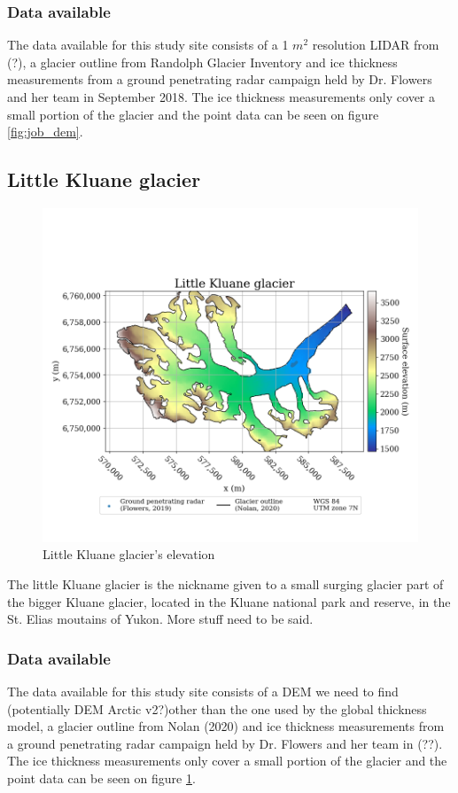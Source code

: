 \documentclass[a4, 12pt]{article}
\begin{document}
\subsubsection{Data available} %
The data available for this study site consists of a 1 $m^2$ resolution LIDAR from (?), a glacier outline from Randolph Glacier Inventory and ice thickness measurements from a ground penetrating radar campaign held by Dr. Flowers and her team in September 2018. The ice thickness measurements only cover a small portion of the glacier and the point data can be seen on figure \ref{fig:job_dem}.\\
\FloatBarrier
\subsection{Little Kluane glacier}
\begin{figure}[h!]
\centering
\includegraphics[scale=0.5]{../job_kluane_maps/Little Kluane glacier_elevation.png}
\caption{Little Kluane glacier's elevation}
\label{fig:lk_dem}
\end{figure}
The little Kluane glacier is the nickname given to a small surging glacier part of the bigger Kluane glacier, located in the Kluane national park and reserve, in the St. Elias moutains of Yukon. More stuff need to be said.
\subsubsection{Data available}
The data available for this study site consists of a DEM we need to find (potentially DEM Arctic v2?)other than the one used by the global thickness model, a glacier outline from Nolan (2020) and ice thickness measurements from a ground penetrating radar campaign held by Dr. Flowers and her team in (??). The ice thickness measurements only cover a small portion of the glacier and the point data can be seen on figure \ref{fig:lk_dem}.
\end{document}
